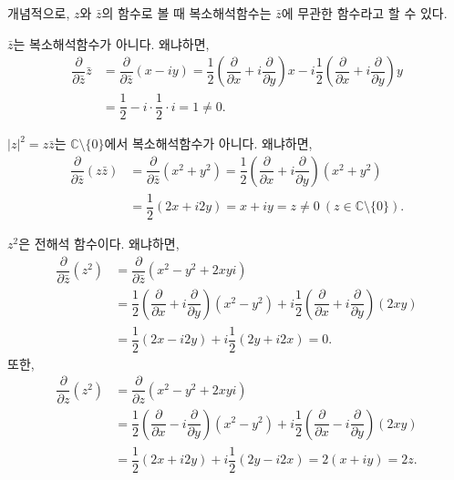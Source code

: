 개념적으로, $z$와 $\bar z$의 함수로 볼 때
복소해석함수는  $\bar z$에 무관한 함수라고 할 수 있다.

\begin{saltexample}[label=example-2-14]{}{}
$\bar z$는 복소해석함수가 아니다. 왜냐하면,
\begin{align*}
\dfrac{\partial}{\partial \bar z}\bar z 
&= \dfrac{\partial}{\partial \bar z} (x-iy)
= \dfrac 12 \left( \dfrac\partial {\partial x} + i \dfrac\partial {\partial y} \right) x
- i \dfrac 12 \left( \dfrac\partial {\partial x} + i \dfrac\partial {\partial y} \right) y \\
&= \dfrac 12 - i\cdot \dfrac12 \cdot i = 1 \ne 0.
\end{align*}
\end{saltexample}

\begin{saltexample}[label=example-2-15]{}{}
$|z|^2 = z\bar z$는 $\mathbb C\setminus \{0\}$에서 복소해석함수가 아니다. 왜냐하면,
\begin{align*}
\dfrac{\partial}{\partial \bar z}(z \bar z)
&= \dfrac{\partial}{\partial \bar z} (x^2+y^2)
= \dfrac12 \left( \dfrac\partial {\partial x} + i \dfrac\partial {\partial y} \right) (x^2+y^2) \\
&= \dfrac 12 (2x+i2y) = x+iy = z \ne 0 \ (z\in\mathbb C\setminus \{0\}).
\end{align*}
\end{saltexample}


\begin{saltexample}[label=example-2-16]{}{}
$z^2$은 전해석 함수이다. 왜냐하면,
\begin{align*}
\dfrac{\partial}{\partial \bar z}(z^2)
&= \dfrac{\partial}{\partial \bar z} (x^2-y^2 + 2xyi) \\
&= \dfrac12 \left( \dfrac\partial {\partial x} + i \dfrac\partial {\partial y} \right) (x^2-y^2) 
+ i \dfrac12 \left( \dfrac\partial {\partial x} + i \dfrac\partial {\partial y} \right) (2xy)  \\
&= \dfrac 12 (2x-i2y) + i\dfrac12(2y+i2x) = 0.
\end{align*}
또한,
\begin{align*}
\dfrac{\partial}{\partial z}(z^2)
&= \dfrac{\partial}{\partial z} (x^2-y^2 + 2xyi) \\
&= \dfrac12 \left( \dfrac\partial {\partial x} - i \dfrac\partial {\partial y} \right) (x^2-y^2) 
+ i \dfrac12 \left( \dfrac\partial {\partial x} - i \dfrac\partial {\partial y} \right) (2xy)  \\
&= \dfrac 12 (2x+i2y) + i\dfrac12(2y-i2x) = 2(x+iy)=2z.
\end{align*}
\end{saltexample}

